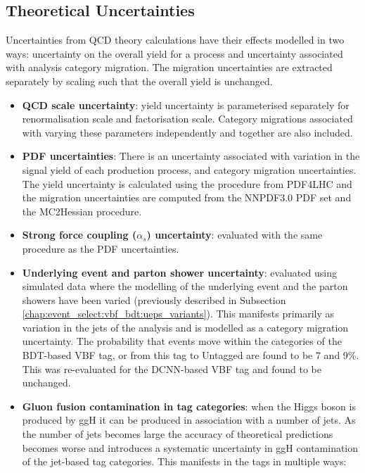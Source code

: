 \subsection{Theoretical Uncertainties}
Uncertainties from QCD theory calculations have their effects modelled in two ways: uncertainty on the overall yield for a process and uncertainty associated with analysis category migration. 
The migration uncertainties are extracted separately by scaling such that the overall yield is unchanged.  
\begin{itemize}[noitemsep]
    \item {\textbf{QCD scale uncertainty}: yield uncertainty is parameterised separately for renormalisation scale and factorisation scale. 
                                            Category migrations associated with varying these parameters independently and together are also included.}
    \item{\textbf{PDF uncertainties}: There is an uncertainty associated with variation in the signal yield of each production process, and category migration uncertainties.   
        The yield uncertainty is calculated using the procedure from PDF4LHC \cite{PDF4LHC} and the migration uncertainties are computed from the NNPDF3.0 PDF set \cite{NNPDF3} and the MC2Hessian \cite{MC2Hessian} procedure.}
    \item{\textbf{Strong force coupling ($\alpha_{s}$) uncertainty}: evaluated with the same procedure as the PDF uncertainties.}
    \item{\textbf{Underlying event and parton shower uncertainty}: evaluated using simulated data where the modelling of the underlying event and the parton showers have been varied (previously described in Subsection \ref{chap:event_select:vbf_bdt:ueps_variants}). This manifests primarily as variation in the jets of the analysis and is modelled as a category migration uncertainty. The probability that events move within the categories of the BDT-based VBF tag, or from this tag to Untagged are found to be 7 and 9\%. This was re-evaluated for the DCNN-based VBF tag and found to be unchanged.}
    \item{\textbf{Gluon fusion contamination in \ttH tag categories}: when the Higgs boson is produced by ggH it can be produced in association with a number of jets. As the number of jets becomes large the accuracy of theoretical predictions becomes worse and introduces a systematic uncertainty in ggH contamination of the jet-based tag categories. This manifests in the \ttH tags in multiple ways:
        \begin{itemize}[noitemsep]

\end{itemize}}
\end{itemize}
